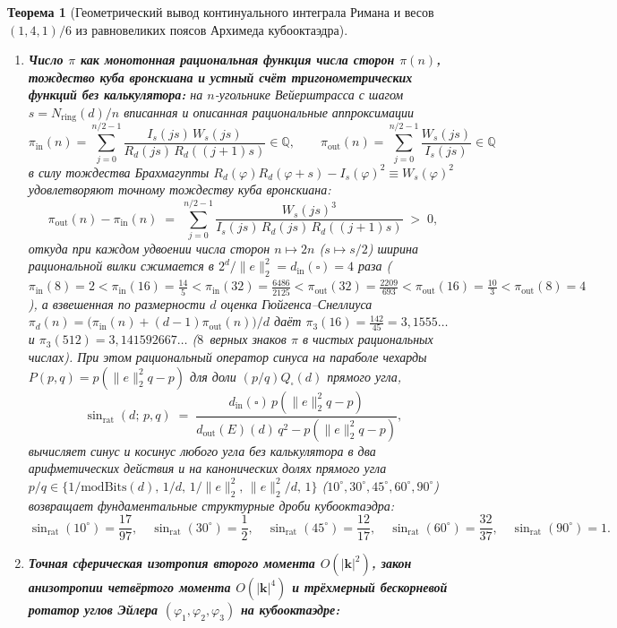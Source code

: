 \documentclass[11pt,a4paper]{article}
\theoremstyle{plain}
\newtheorem{theorem}{Теорема}[section]
\theoremstyle{definition}
\begin{document}
\begin{theorem}[Геометрический вывод континуального интеграла Римана и весов $(1,4,1)/6$ из равновеликих поясов Архимеда кубооктаэдра]
\begin{enumerate}[label=\textbf{(\roman*)},leftmargin=*]
\item \textbf{Число $\pi$ как монотонная рациональная функция числа сторон $\pi(n)$, тождество куба вронскиана и устный счёт тригонометрических функций без калькулятора:}
  на $n$-угольнике Вейерштрасса с шагом $s = N_{\mathrm{ring}}(d)/n$ вписанная и описанная рациональные аппроксимации
  \[
    \pi_{\mathrm{in}}(n) = \sum_{j=0}^{n/2-1}\frac{I_s(js)\,W_s(js)}{R_d(js)\,R_d((j+1)s)}\in\mathbb{Q},\qquad
    \pi_{\mathrm{out}}(n) = \sum_{j=0}^{n/2-1}\frac{W_s(js)}{I_s(js)}\in\mathbb{Q}
  \]
  в силу тождества Брахмагупты $R_d(\varphi)R_d(\varphi+s)-I_s(\varphi)^2 \equiv W_s(\varphi)^2$ удовлетворяют точному \emph{тождеству куба вронскиана}:
  \begin{equation}
    \label{eq:wronskian-cube-pi-gap}
    \pi_{\mathrm{out}}(n) - \pi_{\mathrm{in}}(n) \;=\; \sum_{j=0}^{n/2-1}\frac{W_s(js)^3}{I_s(js)\,R_d(js)\,R_d((j+1)s)} \;>\; 0,
  \end{equation}
  откуда при каждом удвоении числа сторон $n\mapsto 2n$ ($s\mapsto s/2$) ширина рациональной вилки сжимается в $2^d/\|e\|_2^2 = d_{\mathrm{in}}(\square) = 4$ раза ($\pi_{\mathrm{in}}(8)=2 < \pi_{\mathrm{in}}(16)=\frac{14}{5} < \pi_{\mathrm{in}}(32)=\frac{6486}{2125} < \pi_{\mathrm{out}}(32)=\frac{2209}{693} < \pi_{\mathrm{out}}(16)=\frac{10}{3} < \pi_{\mathrm{out}}(8)=4$), а взвешенная по размерности $d$ оценка Гюйгенса--Снеллиуса $\pi_d(n) = \bigl(\pi_{\mathrm{in}}(n)+(d-1)\pi_{\mathrm{out}}(n)\bigr)/d$ даёт $\pi_3(16) = \frac{142}{45} = 3{,}1555\dots$ и $\pi_3(512) = 3{,}141592667\dots$ ($8$~верных знаков $\pi$ в чистых рациональных числах). При этом рациональный оператор синуса на параболе чехарды $P(p,q)=p(\|e\|_2^2 q - p)$ для доли $(p/q)Q_\square(d)$ прямого угла,
  \[
    \sin_{\mathrm{rat}}(d;\,p,q) \;=\; \frac{d_{\mathrm{in}}(\square)\,p(\|e\|_2^2 q - p)}{d_{\mathrm{out}}(E)(d)\,q^2 - p(\|e\|_2^2 q - p)},
  \]
  вычисляет синус и косинус любого угла без калькулятора в два арифметических действия и на канонических долях прямого угла $p/q\in\{1/\mathrm{modBits}(d),\,1/d,\,1/\|e\|_2^2,\,\|e\|_2^2/d,\,1\}$ ($10^\circ,30^\circ,45^\circ,60^\circ,90^\circ$) возвращает фундаментальные структурные дроби кубооктаэдра:
  \[
    \sin_{\mathrm{rat}}(10^\circ) = \frac{17}{97},\quad
    \sin_{\mathrm{rat}}(30^\circ) = \frac{1}{2},\quad
    \sin_{\mathrm{rat}}(45^\circ) = \frac{12}{17},\quad
    \sin_{\mathrm{rat}}(60^\circ) = \frac{32}{37},\quad
    \sin_{\mathrm{rat}}(90^\circ) = 1.
  \]
\item \textbf{Точная сферическая изотропия второго момента $O(|\mathbf{k}|^2)$, закон анизотропии четвёртого момента $O(|\mathbf{k}|^4)$ и трёхмерный бескорневой ротатор углов Эйлера $(\varphi_1,\varphi_2,\varphi_3)$ на кубооктаэдре:}

\end{enumerate}
\end{theorem}
\end{document}
